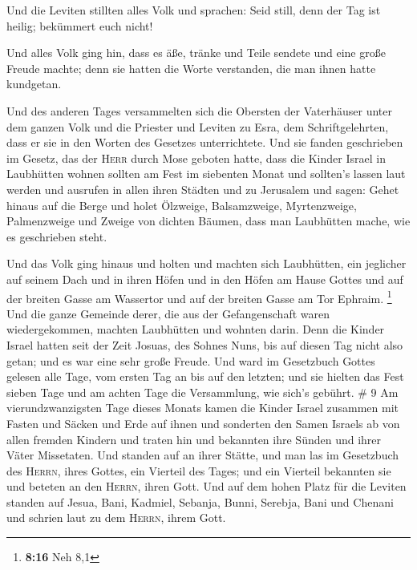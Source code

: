  Und die Leviten stillten alles Volk und sprachen: Seid
still, denn der Tag ist heilig; bekümmert euch nicht!

 Und alles Volk ging hin, dass es äße, tränke und Teile
sendete und eine große Freude machte; denn sie hatten die Worte
verstanden, die man ihnen hatte kundgetan.

 Und des anderen Tages versammelten sich die Obersten der
Vaterhäuser unter dem ganzen Volk und die Priester und Leviten zu Esra,
dem Schriftgelehrten, dass er sie in den Worten des Gesetzes
unterrichtete.  Und sie fanden geschrieben im Gesetz, das
der \textsc{Herr} durch Mose geboten hatte, dass die Kinder Israel in
Laubhütten wohnen sollten am Fest im siebenten Monat  und
sollten's lassen laut werden und ausrufen in allen ihren Städten und zu
Jerusalem und sagen: Gehet hinaus auf die Berge und holet Ölzweige,
Balsamzweige, Myrtenzweige, Palmenzweige und Zweige von dichten Bäumen,
dass man Laubhütten mache, wie es geschrieben steht.

 Und das Volk ging hinaus und holten und machten sich
Laubhütten, ein jeglicher auf seinem Dach und in ihren Höfen und in den
Höfen am Hause Gottes und auf der breiten Gasse am Wassertor und auf der
breiten Gasse am Tor Ephraim. \footnote{\textbf{8:16} Neh 8,1}
 Und die ganze Gemeinde derer, die aus der Gefangenschaft
waren wiedergekommen, machten Laubhütten und wohnten darin. Denn die
Kinder Israel hatten seit der Zeit Josuas, des Sohnes Nuns, bis auf
diesen Tag nicht also getan; und es war eine sehr große Freude.
 Und ward im Gesetzbuch Gottes gelesen alle Tage, vom
ersten Tag an bis auf den letzten; und sie hielten das Fest sieben Tage
und am achten Tage die Versammlung, wie sich's gebührt. \# 9
 Am vierundzwanzigsten Tage dieses Monats kamen die Kinder
Israel zusammen mit Fasten und Säcken und Erde auf ihnen 
und sonderten den Samen Israels ab von allen fremden Kindern und traten
hin und bekannten ihre Sünden und ihrer Väter Missetaten. 
Und standen auf an ihrer Stätte, und man las im Gesetzbuch des
\textsc{Herrn}, ihres Gottes, ein Vierteil des Tages; und ein Vierteil
bekannten sie und beteten an den \textsc{Herrn}, ihren Gott.
 Und auf dem hohen Platz für die Leviten standen auf
Jesua, Bani, Kadmiel, Sebanja, Bunni, Serebja, Bani und Chenani und
schrien laut zu dem \textsc{Herrn}, ihrem Gott.

